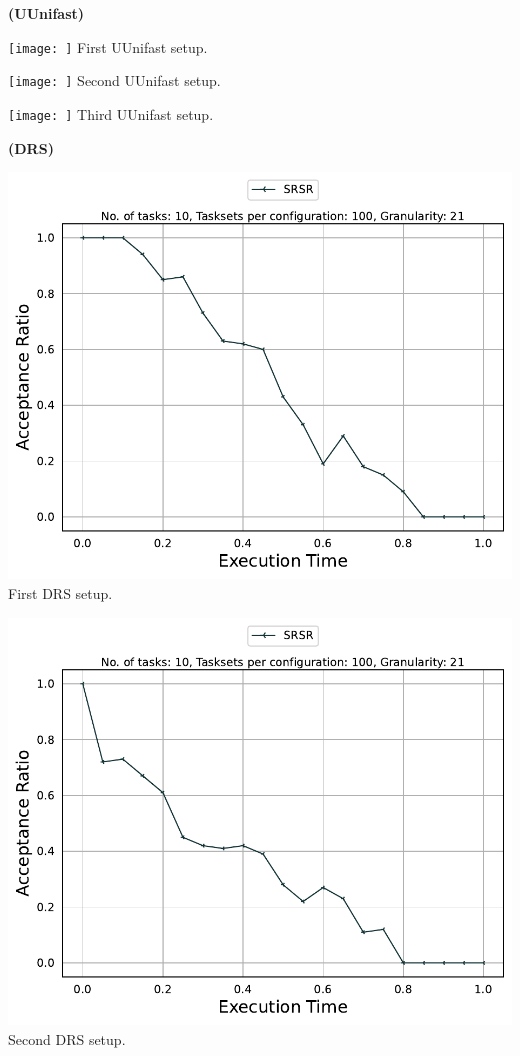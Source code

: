\documentclass[]{article}
\begin{document}
	\begin{minipage}[t]{0.48\linewidth}
		\centering
		\textbf{(UUnifast)}
		\vspace{0.3cm}
		
		\texttt{[image: ]}
		First UUnifast setup.
		\vspace{0.3cm}
		
		\texttt{[image: ]}
		Second UUnifast setup.
		\vspace{0.3cm}
		
            \texttt{[image: ]}
		  Third UUnifast setup.
		\vspace{0.3cm}
		
	\end{minipage}\hfill
	\begin{minipage}[t]{0.48\linewidth}
		\centering
		\textbf{(DRS)}
		\vspace{0.3cm}
		
		\includegraphics[width=\linewidth]{SRSR[21][0.01-0.1][10].pdf}
		First DRS setup.
		\vspace{0.3cm}
		
		\includegraphics[width=\linewidth]{SRSR_2nd.pdf}
		Second DRS setup.
		\vspace{0.3cm}


\end{minipage}
\end{document}
